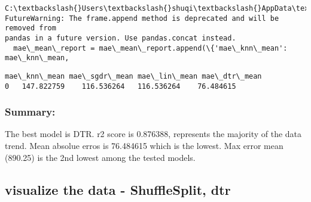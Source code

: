\documentclass[11pt]{article}
\makeatletter
\newcommand{\boxspacing}{\kern\kvtcb@left@rule\kern\kvtcb@boxsep}
\newcommand{\prompt}[4]{
        {\ttfamily\llap{{\color{#2}[#3]:\hspace{3pt}#4}}\vspace{-\baselineskip}}
    }
\makeatother
\begin{document}
    \begin{Verbatim}[commandchars=\\\{\}]
C:\textbackslash{}Users\textbackslash{}shuqi\textbackslash{}AppData\textbackslash{}Local\textbackslash{}Temp\textbackslash{}ipykernel\_10424\textbackslash{}2850408021.py:9:
FutureWarning: The frame.append method is deprecated and will be removed from
pandas in a future version. Use pandas.concat instead.
  mae\_mean\_report = mae\_mean\_report.append(\{'mae\_knn\_mean': mae\_knn\_mean,
    \end{Verbatim}

            \begin{tcolorbox}[breakable, size=fbox, boxrule=.5pt, pad at break*=1mm, opacityfill=0]
\prompt{Out}{outcolor}{97}{\boxspacing}
\begin{Verbatim}[commandchars=\\\{\}]
  mae\_knn\_mean mae\_sgdr\_mean mae\_lin\_mean mae\_dtr\_mean
0   147.822759    116.536264   116.536264    76.484615
\end{Verbatim}
\end{tcolorbox}
        
    \hypertarget{summary}{%
\subsubsection{Summary:}\label{summary}}

The best model is DTR. r2 score is 0.876388, represents the majority of
the data trend. Mean absolue erros is 76.484615 which is the lowest. Max
error mean (890.25) is the 2nd lowest among the tested models.

    \hypertarget{visualize-the-data---shufflesplit-dtr}{%
\subsection{visualize the data - ShuffleSplit,
dtr}\label{visualize-the-data---shufflesplit-dtr}}
\end{document}
